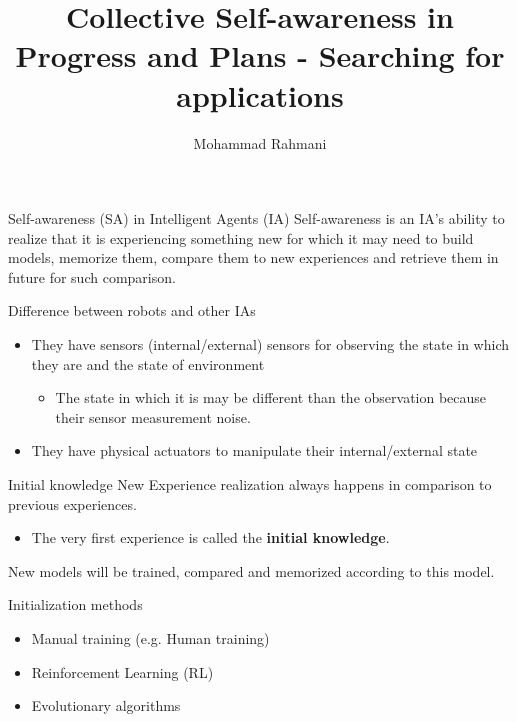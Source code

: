 \documentclass[unknownkeysallowed]{beamer}
\title{Collective Self-awareness in Progress and Plans -  Searching for applications}
\author{Mohammad Rahmani}
\institute{DECIDE Doctoral School}
\begin{document}
	\begin{frame}
		\maketitle
	\end{frame}
	
	\begin{frame}{Self-awareness (SA) in Intelligent Agents (IA)}
		Self-awareness is an IA's ability to realize that it is experiencing something new for which it may need to build models, memorize them, compare them to new experiences and retrieve them in future for such comparison.  
	\end{frame}

	\begin{frame}{Difference between robots and other IAs}
		\begin{itemize}
			\item They have sensors (internal/external) sensors for observing the state in which they are and the state of environment
			\begin{itemize}
				\item The state in which it is may be different than the observation because their sensor measurement noise.
			\end{itemize}
			\item They have physical actuators to manipulate their internal/external state
		\end{itemize}
	\end{frame}

	\begin{frame}{Initial knowledge}
		New Experience realization always happens in comparison to previous experiences. 
		\begin{itemize}
			\item The very first experience is called the \textbf{initial knowledge}.  
		\end{itemize}
		New models will be trained, compared and memorized according to this model.
	\end{frame}

	\begin{frame}{Initialization methods}
		\begin{itemize}
			\item Manual training (e.g. Human training)
			\item Reinforcement Learning (RL)
			\item Evolutionary algorithms
		\end{itemize}
	\end{frame}
\end{document}
